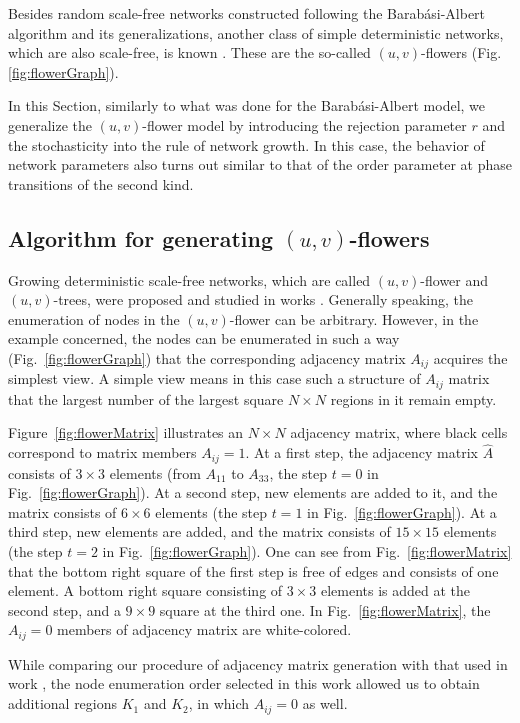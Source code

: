 \documentclass[aps,preprint]{revtex4}%
\begin{document}
Besides random scale-free networks constructed following the
Barab\'{a}si-Albert algorithm and its generalizations, another class of simple
deterministic networks, which are also scale-free, is known \cite{Rozenfeld2}.
These are the so-called $(u,v)$-flowers (Fig. \ref{fig:flowerGraph}).

In this Section, similarly to what was done for the Barab\'{a}si-Albert model,
we generalize the $(u,v)$-flower model by introducing the rejection parameter
$r$ and the stochasticity into the rule of network growth. In this case, the
behavior of network parameters also turns out similar to that of the order
parameter at phase transitions of the second kind.

\subsection{Algorithm for generating $(u,v)$-flowers}

Growing deterministic scale-free networks, which are called $(u,v)$-flower and
$(u,v)$-trees, were proposed and studied in works
\cite{Dor1,Rozenfeld1,Rozenfeld2}. Generally speaking, the enumeration of
nodes in the $(u,v)$-flower can be arbitrary. However, in the example
concerned, the nodes can be enumerated in such a way
(Fig.~\ref{fig:flowerGraph}) that the corresponding adjacency matrix $A_{ij}$
acquires the simplest view. A simple view means in this case such a structure
of $A_{ij}$ matrix that the largest number of the largest square $N\times N$
regions in it remain empty.

Figure~\ref{fig:flowerMatrix} illustrates an $N\times N$ adjacency matrix,
where black cells correspond to matrix members $A_{ij}=1$. At a first step,
the adjacency matrix $\hat{A}$ consists of $3\times3$ elements (from $A_{11}$
to $A_{33}$, the step $t=0$ in Fig.~\ref{fig:flowerGraph}). At a second step,
new elements are added to it, and the matrix consists of $6\times6$ elements
(the step $t=1$ in Fig.~\ref{fig:flowerGraph}). At a third step, new elements
are added, and the matrix consists of $15\times15$ elements (the step $t=2$ in
Fig.~\ref{fig:flowerGraph}). One can see from Fig.~\ref{fig:flowerMatrix} that
the bottom right square of the first step is free of edges and consists of one
element. A bottom right square consisting of $3\times3$ elements is added at
the second step, and a $9\times9$ square at the third one. In
Fig.~\ref{fig:flowerMatrix}, the $A_{ij}=0$ members of adjacency matrix are white-colored.

While comparing our procedure of adjacency matrix generation with that used in
work \cite{Dor1}, the node enumeration order selected in this work allowed us
to obtain additional regions $K_{1}$ and $K_{2}$, in which $A_{ij}=0$ as well.
\end{document}
